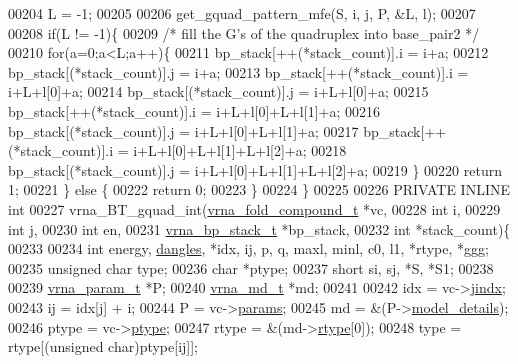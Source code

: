 \begin{DoxyCode}
00204   L = -1;
00205 
00206   get\_gquad\_pattern\_mfe(S, i, j, P, &L, l);
00207 
00208   \textcolor{keywordflow}{if}(L != -1)\{
00209     \textcolor{comment}{/* fill the G's of the quadruplex into base\_pair2 */}
00210     \textcolor{keywordflow}{for}(a=0;a<L;a++)\{
00211       bp\_stack[++(*stack\_count)].i = i+a;
00212       bp\_stack[(*stack\_count)].j   = i+a;
00213       bp\_stack[++(*stack\_count)].i = i+L+l[0]+a;
00214       bp\_stack[(*stack\_count)].j   = i+L+l[0]+a;
00215       bp\_stack[++(*stack\_count)].i = i+L+l[0]+L+l[1]+a;
00216       bp\_stack[(*stack\_count)].j   = i+L+l[0]+L+l[1]+a;
00217       bp\_stack[++(*stack\_count)].i = i+L+l[0]+L+l[1]+L+l[2]+a;
00218       bp\_stack[(*stack\_count)].j   = i+L+l[0]+L+l[1]+L+l[2]+a;
00219     \}
00220     \textcolor{keywordflow}{return} 1;
00221   \} \textcolor{keywordflow}{else} \{
00222     \textcolor{keywordflow}{return} 0;
00223   \}
00224 \}
00225 
00226 PRIVATE INLINE \textcolor{keywordtype}{int}
00227 vrna\_BT\_gquad\_int(\hyperlink{group__fold__compound_structvrna__fc__s}{vrna\_fold\_compound\_t} *vc,
00228                   \textcolor{keywordtype}{int} i,
00229                   \textcolor{keywordtype}{int} j,
00230                   \textcolor{keywordtype}{int} en,
00231                   \hyperlink{group__data__structures_structvrna__bp__stack__s}{vrna\_bp\_stack\_t} *bp\_stack,
00232                   \textcolor{keywordtype}{int} *stack\_count)\{
00233 
00234   \textcolor{keywordtype}{int}           energy, \hyperlink{group__model__details_ga72b511ed1201f7e23ec437e468790d74}{dangles}, *idx, ij, p, q, maxl, minl, c0, l1, *rtype, *ggg;
00235   \textcolor{keywordtype}{unsigned} \textcolor{keywordtype}{char} type;
00236   \textcolor{keywordtype}{char}          *ptype;
00237   \textcolor{keywordtype}{short}         si, sj, *S, *S1;
00238 
00239   \hyperlink{group__energy__parameters_structvrna__param__s}{vrna\_param\_t}  *P;
00240   \hyperlink{group__model__details_structvrna__md__s}{vrna\_md\_t}     *md;
00241 
00242   idx         = vc->\hyperlink{group__fold__compound_a5037235dee512efd85ca543780bbca1a}{jindx};
00243   ij          = idx[j] + i;
00244   P           = vc->\hyperlink{group__fold__compound_a19b8720c2c5321c1b97c830bd17566ea}{params};
00245   md          = &(P->\hyperlink{group__energy__parameters_a7b84353eb9075c595bad4ceb871bcae7}{model\_details});
00246   ptype       = vc->\hyperlink{group__fold__compound_a3fbea559f1d1976b2d67c215cdeee0b2}{ptype};
00247   rtype       = &(md->\hyperlink{group__model__details_ad082d0fea31e002b90cdfe5e6382f8b0}{rtype}[0]);
00248   type        = rtype[(\textcolor{keywordtype}{unsigned} char)ptype[ij]];

\end{DoxyCode}
